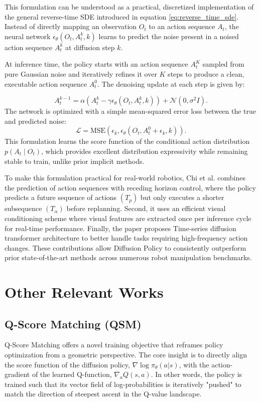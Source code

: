 This formulation can be understood as a practical, discretized implementation of the general reverse-time SDE introduced in equation \ref{eq:reverse_time_sde}. Instead of directly mapping an observation $O_t$ to an action sequence $A_t$, the neural network $\epsilon_\theta(O_t, A_t^k, k)$ learns to predict the noise present in a noised action sequence $A_t^k$ at diffusion step $k$. 

At inference time, the policy starts with an action sequence $A_t^K$ sampled from pure Gaussian noise and iteratively refines it over $K$ steps to produce a clean, executable action sequence $A_t^0$. The denoising update at each step is given by:

\begin{equation}
	A_{t}^{k-1}=\alpha\left(A_{t}^{k}-\gamma\epsilon_{\theta}(O_{t},A_{t}^{k},k)\right)+\mathcal{N}(0,\sigma^{2}I).
\end{equation}
The network is optimized with a simple mean-squared error loss between the true and predicted noise:
\begin{equation}
	\mathcal{L} = \text{MSE}(\epsilon_k, \epsilon_\theta(O_t, A_t^0 + \epsilon_k, k)).
\end{equation}
This formulation learns the score function of the conditional action distribution $p(A_{t}\mid O_t)$, which provides excellent distribution expressivity while remaining stable to train, unlike prior implicit methods.

To make this formulation practical for real-world robotics, Chi et al. combines the prediction of action sequences with receding horizon control, where the policy predicts a future sequence of actions $(T_p)$ but only executes a shorter subsequence $(T_{\alpha})$ before replanning. Second, it uses an efficient visual conditioning scheme where visual features are extracted once per inference cycle for real-time performance. Finally, the paper proposes Time-series diffusion transformer architecture to better handle tasks requiring high-frequency action changes. These contributions allow Diffusion Policy to consistently outperform prior state-of-the-art methods across numerous robot manipulation benchmarks.

\section{Other Relevant Works}
\label{sec:other_works}
\subsection{Q-Score Matching (QSM)}
Q-Score Matching offers a novel training objective that reframes policy optimization from a geometric perspective\cite{psenkaLearningDiffusionModel2025b}. The core insight is to directly align the score function of the diffusion policy, $\nabla \log \pi_{\theta}(a|s)$, with the action-gradient of the learned Q-function, $\nabla_a Q(s,a)$. In other words, the policy is trained such that its vector field of log-probabilities is iteratively "pushed" to match the direction of steepest ascent in the Q-value landscape.

